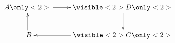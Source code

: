 \documentclass{beamer}
\begin{document}
\begin{frame}
\begin{displaymath}
\xymatrix{A \only<2>{\ar[r]} & \visible<2>{D} \only<2>{\ar[d]} \\\ B \ar[u] & \visible<2>{C} \only<2>{\ar[l]}}
\end{displaymath}

\end{frame} 
\end{document}
